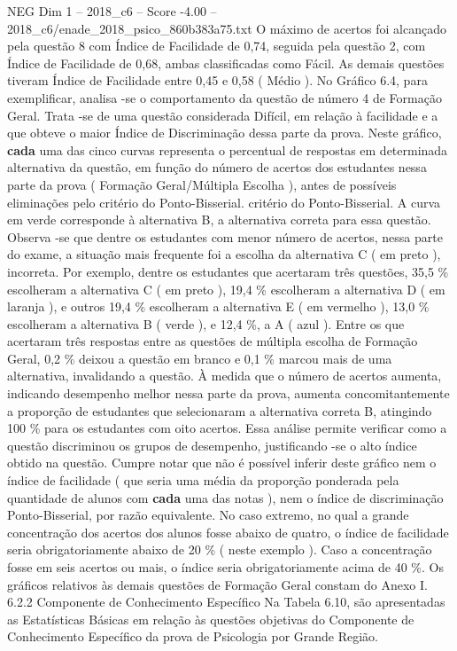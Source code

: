 \begin{textsample}{NEG Dim 1 – 2018\_c6 – Score -4.00 – 2018\_c6/enade\_2018\_psico\_860b383a75.txt}
O máximo de acertos foi alcançado pela questão 8 com Índice de Facilidade de 0,74, seguida pela questão 2, com Índice de Facilidade de 0,68, ambas classificadas como Fácil.
As demais questões tiveram Índice de Facilidade entre 0,45 e 0,58 ( Médio ).
No Gráfico 6.4, para exemplificar, analisa -se o comportamento da questão de número 4 de Formação Geral.
Trata -se de uma questão considerada Difícil, em relação à facilidade e a que obteve o maior Índice de Discriminação dessa parte da prova.
Neste gráfico, \textbf{cada} uma das cinco curvas representa o percentual de respostas em determinada alternativa da questão, em função do número de acertos dos estudantes nessa parte da prova ( Formação Geral/Múltipla Escolha ), antes de possíveis eliminações pelo critério do Ponto-Bisserial. critério do Ponto-Bisserial.
A curva em verde corresponde à alternativa B, a alternativa correta para essa questão.
Observa -se que dentre os estudantes com menor número de acertos, nessa parte do exame, a situação mais frequente foi a escolha da alternativa C ( em preto ), incorreta.
Por exemplo, dentre os estudantes que acertaram três questões, 35,5 \% escolheram a alternativa C ( em preto ), 19,4 \% escolheram a alternativa D ( em laranja ), e outros 19,4 \% escolheram a alternativa E ( em vermelho ), 13,0 \% escolheram a alternativa B ( verde ), e 12,4 \%, a A ( azul ).
Entre os que acertaram três respostas entre as questões de múltipla escolha de Formação Geral, 0,2 \% deixou a questão em branco e 0,1 \% marcou mais de uma alternativa, invalidando a questão.
À medida que o número de acertos aumenta, indicando desempenho melhor nessa parte da prova, aumenta concomitantemente a proporção de estudantes que selecionaram a alternativa correta B, atingindo 100 \% para os estudantes com oito acertos.
Essa análise permite verificar como a questão discriminou os grupos de desempenho, justificando -se o alto índice obtido na questão.
Cumpre notar que não é possível inferir deste gráfico nem o índice de facilidade ( que seria uma média da proporção ponderada pela quantidade de alunos com \textbf{cada} uma das notas ), nem o índice de discriminação Ponto-Bisserial, por razão equivalente.
No caso extremo, no qual a grande concentração dos acertos dos alunos fosse abaixo de quatro, o índice de facilidade seria obrigatoriamente abaixo de 20 \% ( neste exemplo ).
Caso a concentração fosse em seis acertos ou mais, o índice seria obrigatoriamente acima de 40 \%.
Os gráficos relativos às demais questões de Formação Geral constam do Anexo I. 6.2.2 Componente de Conhecimento Específico Na Tabela 6.10, são apresentadas as Estatísticas Básicas em relação às questões objetivas do Componente de Conhecimento Específico da prova de Psicologia por Grande Região.

\end{textsample}
